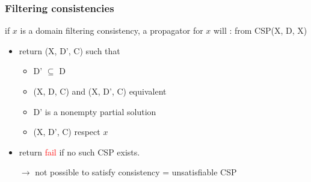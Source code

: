 \subsubsection{Filtering consistencies}

if $x$ is a domain filtering consistency, a propagator for $x$ will :
from CSP(X, D, X)
\begin{itemize}
    \item return (X, D', C) such that
        \begin{itemize}
            \item D' $\subseteq$ D
            \item (X, D, C) and (X, D', C) equivalent
            \item D' is a nonempty partial solution
            \item (X, D', C) respect $x$
        \end{itemize}
    \item return \textcolor{red}{fail} if no such CSP exists.

        $\to$ not possible to satisfy consistency = unsatisfiable CSP
\end{itemize}

